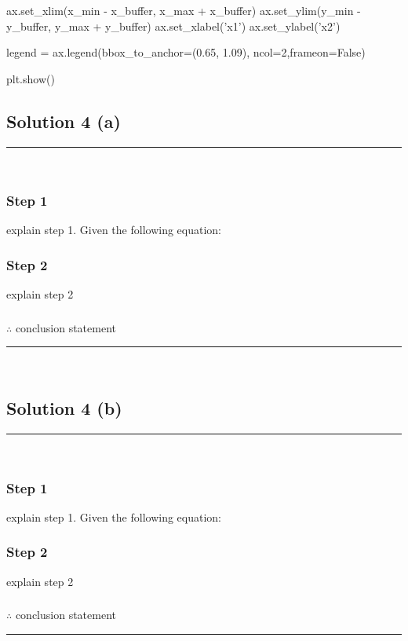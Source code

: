 ax.set_xlim(x_min - x_buffer, x_max + x_buffer)
ax.set_ylim(y_min - y_buffer, y_max + y_buffer)
ax.set_xlabel('x1')
ax.set_ylabel('x2')

legend = ax.legend(bbox_to_anchor=(0.65, 1.09), ncol=2,frameon=False)

plt.show()
\subsection*{Solution 4 (a)}
\noindent\rule{\textwidth}{0.4pt}\\

\subsubsection*{Step 1}
\parbox{\textwidth}{

explain step 1.
Given the following equation:\\

}

\subsubsection*{Step 2}
\parbox{\textwidth}{

explain step 2\\

}

\subsubsection*{\normalfont}{$\therefore$ conclusion statement}

\noindent\rule{\textwidth}{0.4pt}\\

\subsection*{Solution 4 (b)}
\noindent\rule{\textwidth}{0.4pt}\\

\subsubsection*{Step 1}
\parbox{\textwidth}{

explain step 1.
Given the following equation:\\

}

\subsubsection*{Step 2}
\parbox{\textwidth}{

explain step 2\\

}

\subsubsection*{\normalfont}{$\therefore$ conclusion statement}

\noindent\rule{\textwidth}{0.4pt}\\


